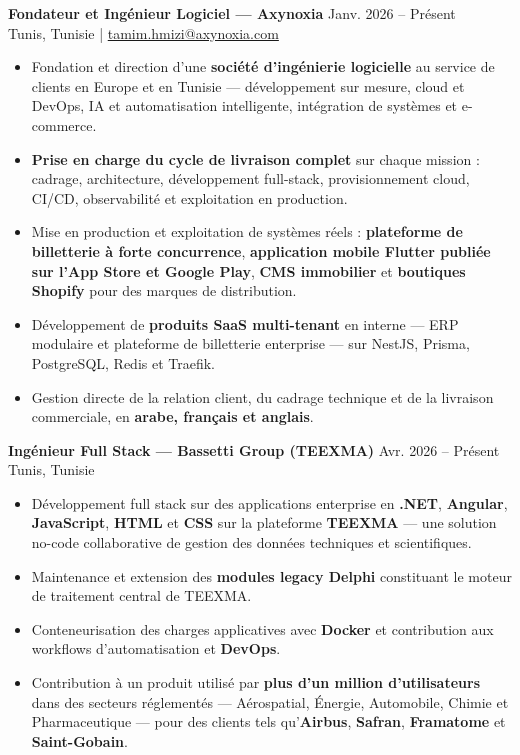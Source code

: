 \documentclass[10pt, letterpaper]{article}
\newenvironment{highlights}{
\begin{itemize}[leftmargin=12pt, itemsep=2pt]
}{
\end{itemize}
}
\begin{document}
\textbf{Fondateur et Ingénieur Logiciel --- Axynoxia} \hfill Janv. 2026 -- Présent \\
Tunis, Tunisie \;|\; \href{mailto:tamim.hmizi@axynoxia.com}{tamim.hmizi@axynoxia.com}
\begin{highlights}
\item Fondation et direction d'une \textbf{société d'ingénierie logicielle} au service de clients en Europe et en Tunisie --- développement sur mesure, cloud et DevOps, IA et automatisation intelligente, intégration de systèmes et e-commerce.
\item \textbf{Prise en charge du cycle de livraison complet} sur chaque mission : cadrage, architecture, développement full-stack, provisionnement cloud, CI/CD, observabilité et exploitation en production.
\item Mise en production et exploitation de systèmes réels : \textbf{plateforme de billetterie à forte concurrence}, \textbf{application mobile Flutter publiée sur l'App Store et Google Play}, \textbf{CMS immobilier} et \textbf{boutiques Shopify} pour des marques de distribution.
\item Développement de \textbf{produits SaaS multi-tenant} en interne --- ERP modulaire et plateforme de billetterie enterprise --- sur NestJS, Prisma, PostgreSQL, Redis et Traefik.
\item Gestion directe de la relation client, du cadrage technique et de la livraison commerciale, en \textbf{arabe, français et anglais}.
\end{highlights}

\textbf{Ingénieur Full Stack --- Bassetti Group (TEEXMA)} \hfill Avr. 2026 -- Présent \\
Tunis, Tunisie
\begin{highlights}
\item Développement full stack sur des applications enterprise en \textbf{.NET}, \textbf{Angular}, \textbf{JavaScript}, \textbf{HTML} et \textbf{CSS} sur la plateforme \textbf{TEEXMA} --- une solution no-code collaborative de gestion des données techniques et scientifiques.
\item Maintenance et extension des \textbf{modules legacy Delphi} constituant le moteur de traitement central de TEEXMA.
\item Conteneurisation des charges applicatives avec \textbf{Docker} et contribution aux workflows d'automatisation et \textbf{DevOps}.
\item Contribution à un produit utilisé par \textbf{plus d'un million d'utilisateurs} dans des secteurs réglementés --- Aérospatial, Énergie, Automobile, Chimie et Pharmaceutique --- pour des clients tels qu'\textbf{Airbus}, \textbf{Safran}, \textbf{Framatome} et \textbf{Saint-Gobain}.
\end{highlights}
\end{document}

